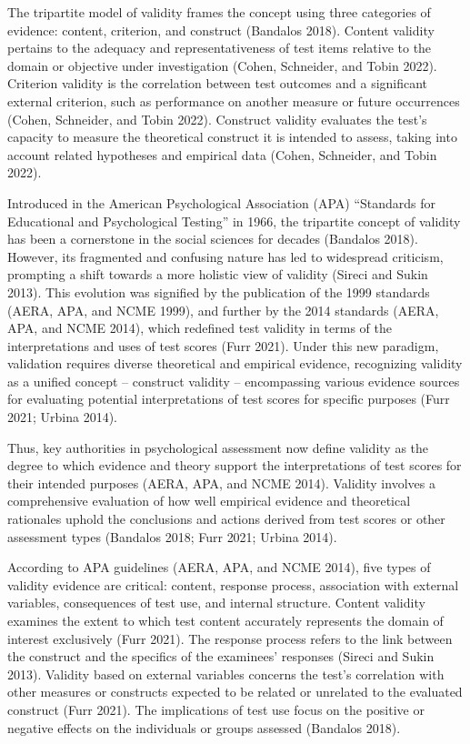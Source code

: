 \documentclass[
  a4paper,
]{article}
\begin{document}
The tripartite model of validity frames the concept using three
categories of evidence: content, criterion, and construct (Bandalos
2018). Content validity pertains to the adequacy and representativeness
of test items relative to the domain or objective under investigation
(Cohen, Schneider, and Tobin 2022). Criterion validity is the
correlation between test outcomes and a significant external criterion,
such as performance on another measure or future occurrences (Cohen,
Schneider, and Tobin 2022). Construct validity evaluates the test's
capacity to measure the theoretical construct it is intended to assess,
taking into account related hypotheses and empirical data (Cohen,
Schneider, and Tobin 2022).

Introduced in the American Psychological Association (APA) ``Standards
for Educational and Psychological Testing'' in 1966, the tripartite
concept of validity has been a cornerstone in the social sciences for
decades (Bandalos 2018). However, its fragmented and confusing nature
has led to widespread criticism, prompting a shift towards a more
holistic view of validity (Sireci and Sukin 2013). This evolution was
signified by the publication of the 1999 standards (AERA, APA, and NCME
1999), and further by the 2014 standards (AERA, APA, and NCME 2014),
which redefined test validity in terms of the interpretations and uses
of test scores (Furr 2021). Under this new paradigm, validation requires
diverse theoretical and empirical evidence, recognizing validity as a
unified concept -- construct validity -- encompassing various evidence
sources for evaluating potential interpretations of test scores for
specific purposes (Furr 2021; Urbina 2014).

Thus, key authorities in psychological assessment now define validity as
the degree to which evidence and theory support the interpretations of
test scores for their intended purposes (AERA, APA, and NCME 2014).
Validity involves a comprehensive evaluation of how well empirical
evidence and theoretical rationales uphold the conclusions and actions
derived from test scores or other assessment types (Bandalos 2018; Furr
2021; Urbina 2014).

According to APA guidelines (AERA, APA, and NCME 2014), five types of
validity evidence are critical: content, response process, association
with external variables, consequences of test use, and internal
structure. Content validity examines the extent to which test content
accurately represents the domain of interest exclusively (Furr 2021).
The response process refers to the link between the construct and the
specifics of the examinees' responses (Sireci and Sukin 2013). Validity
based on external variables concerns the test's correlation with other
measures or constructs expected to be related or unrelated to the
evaluated construct (Furr 2021). The implications of test use focus on
the positive or negative effects on the individuals or groups assessed
(Bandalos 2018).
\end{document}
